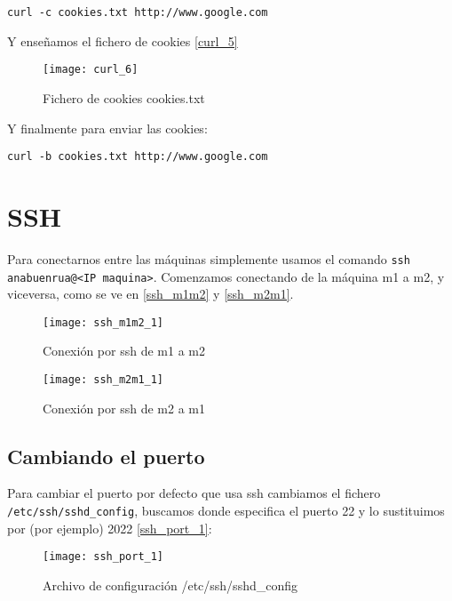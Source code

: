 \begin{verbatim}
curl -c cookies.txt http://www.google.com
\end{verbatim}

Y enseñamos el fichero de cookies \eqref{curl_5}

\begin{figure}[h!]
\begin{center}
\caption{Fichero de cookies cookies.txt}
\label{curl_5}
\texttt{[image: curl\_6]}
\end{center}
\end{figure}

Y finalmente para enviar las cookies:

\begin{verbatim}
curl -b cookies.txt http://www.google.com
\end{verbatim}

\chapter{SSH}

Para conectarnos entre las máquinas simplemente usamos el comando \verb|ssh anabuenrua@<IP maquina>|. Comenzamos conectando de la máquina m1 a m2, y viceversa, como se ve en \eqref{ssh_m1m2} y \eqref{ssh_m2m1}.


\begin{figure}[h!]
\begin{center}
\caption{Conexión por ssh de m1 a m2}
\label{ssh_m1m2}
\texttt{[image: ssh\_m1m2\_1]}
\end{center}
\end{figure}


\begin{figure}[h!]
\begin{center}
\caption{Conexión por ssh de m2 a m1}
\label{ssh_m2m1}
\texttt{[image: ssh\_m2m1\_1]}
\end{center}
\end{figure}

\section{Cambiando el puerto}

Para cambiar el puerto por defecto que usa ssh cambiamos el fichero \verb|/etc/ssh/sshd_config|, buscamos donde especifica el puerto 22 y lo sustituimos por (por ejemplo) 2022 \eqref{ssh_port_1}:

\begin{figure}[h!]
\begin{center}
\caption{Archivo de configuración /etc/ssh/sshd\_config}
\label{ssh_port_1}
\texttt{[image: ssh\_port\_1]}
\end{center}
\end{figure}

